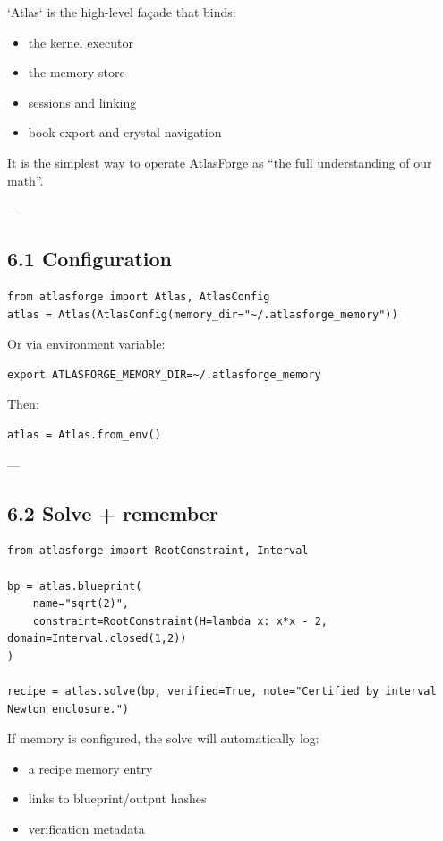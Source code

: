\documentclass[11pt]{article}
\begin{document}
`Atlas` is the high-level façade that binds:

\begin{itemize}
\item the kernel executor
\item the memory store
\item sessions and linking
\item book export and crystal navigation
\end{itemize}

It is the simplest way to operate AtlasForge as “the full understanding of our math”.

---

\subsection{6.1 Configuration}

\begin{lstlisting}
from atlasforge import Atlas, AtlasConfig
atlas = Atlas(AtlasConfig(memory_dir="~/.atlasforge_memory"))
\end{lstlisting}

Or via environment variable:

\begin{lstlisting}
export ATLASFORGE_MEMORY_DIR=~/.atlasforge_memory
\end{lstlisting}

Then:

\begin{lstlisting}
atlas = Atlas.from_env()
\end{lstlisting}

---

\subsection{6.2 Solve + remember}

\begin{lstlisting}
from atlasforge import RootConstraint, Interval

bp = atlas.blueprint(
    name="sqrt(2)",
    constraint=RootConstraint(H=lambda x: x*x - 2, domain=Interval.closed(1,2))
)

recipe = atlas.solve(bp, verified=True, note="Certified by interval Newton enclosure.")
\end{lstlisting}

If memory is configured, the solve will automatically log:
\begin{itemize}
\item a recipe memory entry
\item links to blueprint/output hashes
\item verification metadata
\end{itemize}
\end{document}
